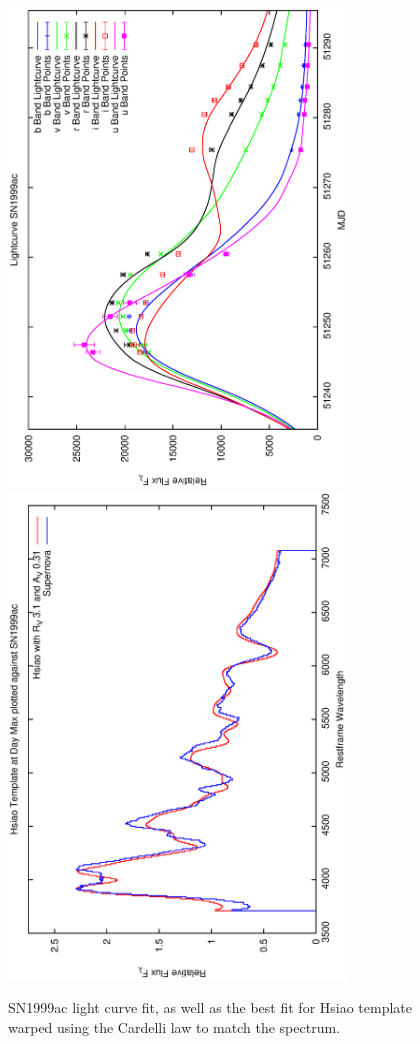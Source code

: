\clearpage

\begin{figure}[p]
\centering
\includegraphics[angle=-90,width=0.8\textwidth]{./figures/ltcv/SN1999ac_v024_lightcurve.ps}
\hfill
\includegraphics[angle=-90,width=0.8\textwidth]{./figures/hsiao/SN1999ac_v001_hsiao.ps}
\hfill
\caption{SN1999ac light curve fit, as well as the best fit for Hsiao template warped using the Cardelli law to match the spectrum.}
\label{fig:SN1999acfour2}
\end{figure}

